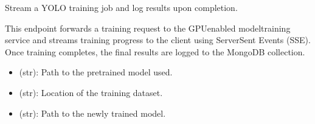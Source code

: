 \documentclass[letterpaper,10pt,english]{sphinxmanual}
\begin{document}

\begin{fulllineitems}
\label{\detokenize{modules/src.pig_sorting_api.main:src.pig_sorting_api.main.proxy_training_stream}}
\pysigstartsignatures
\pysiglinewithargsret
{}
{\sphinxparamcomma {}\sphinxparamcomma {}\sphinxparamcomma {}\sphinxparamcomma {}}
{}
\pysigstopsignatures
\sphinxAtStartPar
Stream a YOLO training job and log results upon completion.

\sphinxAtStartPar
This endpoint forwards a training request to the GPU\sphinxhyphen{}enabled
model\sphinxhyphen{}training service and streams training progress to the client
using Server\sphinxhyphen{}Sent Events (SSE). Once training completes, the final
results are logged to the MongoDB  collection.
\begin{description}
\begin{itemize}
\item {} 
\sphinxAtStartPar
{} (str): Path to the pretrained model used.

\item {} 
\sphinxAtStartPar
{} (str): Location of the training dataset.

\item {} 
\sphinxAtStartPar
{} (str): Path to the newly trained model.


\end{itemize}
\end{description}
\end{fulllineitems}
\end{document}
